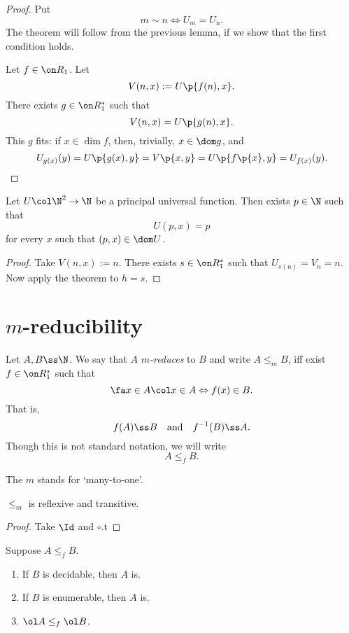 \begin{proof}
  Put
  $$ m \sim n \iff U_m = U_n. $$
  The theorem will follow from the previous lemma, if we show that the first condition holds.
  
  Let $f \in \Comp_1$.
  Let
  $$ V(n, x) := U\p{f(n), x}. $$
  There exists $g \in \Comp_1^*$ such that
  $$ V(n, x) = U\p{g(n), x}. $$
  This $g$ fits: if $x \in \dim f$, then, trivially, $x \in \dom g$, and
  $$ U_{g(x)}(y) = U\p{g(x), y} = V\p{x, y} = U\p{f\p{x},y} = U_{f(x)}(y). $$ 
\end{proof}

\begin{corollary}
  Let $U \col \N^2 \to \N$ be a principal universal function. Then exists $p \in \N$ such that
  $$U(p, x) = p$$
  for every $x$ such that $(p, x) \in \dom U$.
\end{corollary}

\begin{proof}
  Take $V(n, x) := n.$ There exists $s \in \Comp_1^*$ such that $U_{s(n)} = V_n = n$.
  Now apply the theorem to $h = s$.
\end{proof}

\section{$m$-reducibility}

\begin{definition}
  Let $A, B \ss \N$.
  We say that $A$ \emph{$m$-reduces} to $B$ and write $A \le_m B$, iff exist $f \in \Comp_1^*$ such that
  $$ \fa x \in A \col x \in A \Leftrightarrow f(x) \in B. $$
  That is,
  $$ f(A) \ss B \quad\text{and}\quad f^{-1}(B) \ss A. $$
  Though this is not standard notation, we will write
  $$ A \le_f B. $$
\end{definition}

\begin{remark}
  The $m$ stands for `many-to-one'.  
\end{remark}

\begin{lemma}
  $\le_m$ is reflexive and transitive.
\end{lemma}

\begin{proof}
  Take $\Id$ and $\circ$.t
\end{proof}

\begin{lemma}
  Suppose $A \le_f B$.
  \begin{enumerate}
    \item If $B$ is decidable, then $A$ is.
    \item If $B$ is enumerable, then $A$ is.
    \item $\ol A \le_f \ol B$.
  \end{enumerate}
\end{lemma}

